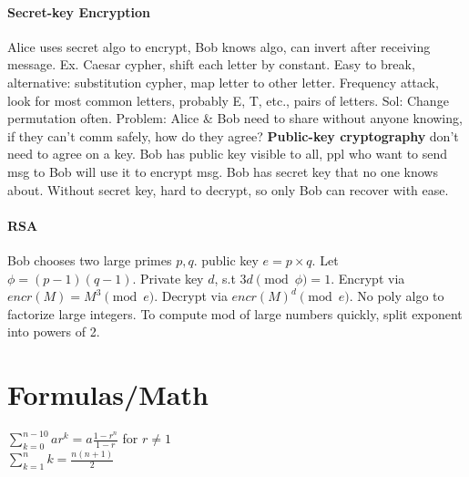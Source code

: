 \paragraph{Secret-key Encryption} Alice uses secret algo to encrypt, Bob knows algo, can invert after receiving message. Ex. Caesar cypher, shift each letter by constant. Easy to break, alternative: substitution cypher, map letter to other letter. Frequency attack, look for most common letters, probably E, T, etc., pairs of letters. Sol: Change permutation often. Problem: Alice \& Bob need to share without anyone knowing, if they can't comm safely, how do they agree? \textbf{Public-key cryptography} don't need to agree on a key. Bob has public key visible to all, ppl who want to send msg to Bob will use it to encrypt msg. Bob has secret key that no one knows about. Without secret key, hard to decrypt, so only Bob can recover with ease.
\vspace{-7 pt}
\paragraph{RSA} Bob chooses two large primes $p , q$. public key $e=p \times q$. Let $\phi=(p-1)(q-1)$. Private key $d$, s.t $3d \pmod{\phi} =1$. Encrypt via $encr(M)=M^3 \pmod{e}$. Decrypt via ${encr(M)}^d \pmod{e}$. No poly algo to factorize large integers. To compute mod of large numbers quickly, split exponent into powers of 2. 
\color{Black}

\section{Formulas/Math}
$\sum_{k=0}^{n-10}ar^{k}=a\frac{1-r^n}{1-r}$ for $r\neq 1$
\\$\sum_{k=1}^{n}k=\frac{n(n+1)}{2}$
